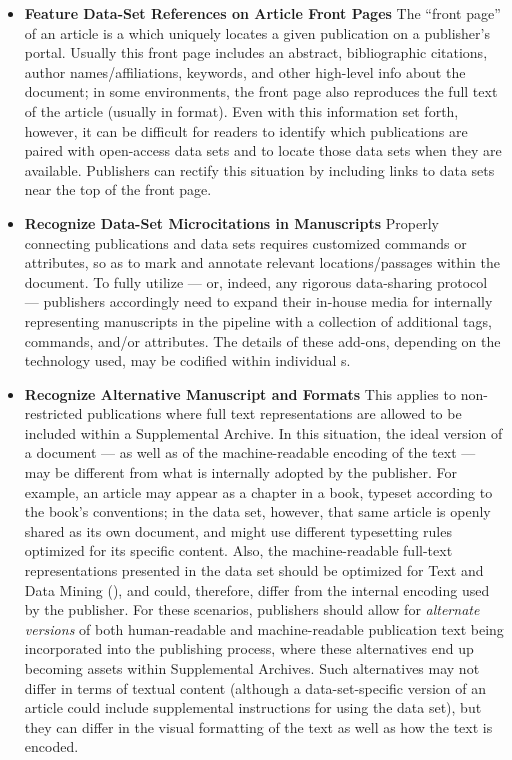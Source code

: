 \documentclass[12pt,letterpaper]{article}
\newcommand{\TDM}{\resizebox{!}{8pt}{\AcronymText{TDM}}}
\newcommand{\ATexttclr}[1]{\textcolor{tcolor}{\textbf{#1}}}
\newcommand{\URL}{\resizebox{!}{8pt}{\AcronymText{URL}}}
\newcommand{\XML}{\resizebox{!}{8pt}{\AcronymText{XML}}}
\newcommand{\textscc}[1]{{\color{orr!35!black}{{%
{\textsc{\textbf{#1}}}}}}}
\newcommand{\AcronymText}[1]{{\textscc{#1}}}
\newcommand{\SDRM}{\resizebox{!}{8pt}{\ATexttclr{SDRM}}}
\newcommand{\SDRF}{\resizebox{!}{8pt}{\ATexttclr{S}}\resizebox{!}{8pt}{\ATexttclr{DR%
\hspace{1pt}{\raisebox{-1pt}{\fontfamily{qhv}\fontseries{b}\selectfont{}\Large{F}}%
}}}}
\newcommand{\HTML}{\resizebox{!}{8pt}{\AcronymText{HTML}}}
\newcommand{\PDF}{\resizebox{!}{8pt}{\AcronymText{PDF}}}
\newcommand{\q}[1]{{\fontfamily{qcr}\selectfont ``}#1{\fontfamily{qcr}\selectfont ''}}
\let\OldLaTeX\LaTeX
\renewcommand{\LaTeX}{\resizebox{!}{8pt}{\color{orr!35!black}{\OldLaTeX}}}
\begin{document}
{{\begin{description}
\begin{itemize}
\item{} \textbf{Feature Data-Set References on Article 
Front Pages} \hspace{14pt}  The \q{front page} of an article is a 
\URL{} which uniquely locates a given publication on a 
publisher's portal.  Usually this front page includes 
an abstract, bibliographic citations, author names/affiliations, 
keywords, and other high-level info about the document; 
in some environments, the front page also reproduces the 
full text of the article (usually in \HTML{} format).  
Even with this information set forth, however, it 
can be difficult for readers to identify which publications 
are paired with open-access data sets and to locate 
those data sets when they are available.  Publishers 
can rectify this situation by including links 
to data sets near the top of the front page.

\item{} \textbf{Recognize Data-Set Microcitations in Manuscripts}  
\hspace{14pt} Properly connecting publications and data sets requires 
customized \LaTeX{} commands or \XML{} attributes, so as 
to mark and annotate relevant locations/passages within the 
document.  To fully utilize \SDRF{} --- or, indeed, 
any rigorous data-sharing protocol --- publishers accordingly 
need to expand their in-house media for internally representing 
manuscripts in the pipeline with a collection of 
additional tags, commands, and/or attributes.  The 
details of these add-ons, depending on the technology 
used, may be codified within individual \SDRM{}s.

\item{} \textbf{Recognize Alternative Manuscript and 
\PDF{} Formats} \hspace{14pt} This applies to non-restricted publications 
where full text representations are allowed to be included within 
a Supplemental Archive.  In this situation, the ideal  
\PDF{} version of a document --- as well as of the machine-readable 
encoding of the text --- may be different from what is 
internally adopted by the publisher.  For example, 
an article may appear as a chapter in a book, typeset 
according to the book's conventions; in the data set, 
however, that same article is openly shared as its own 
document, and might use different typesetting rules 
optimized for its specific content.  Also, the 
machine-readable full-text representations presented 
in the data set should be optimized for Text and Data 
Mining (\TDM{}), and could, therefore, differ from the 
internal encoding used by the publisher.  For these 
scenarios, publishers should allow for \textit{alternate 
versions} of both human-readable and machine-readable 
publication text being incorporated into the publishing 
process, where these alternatives end up becoming 
assets within Supplemental Archives.  Such alternatives 
may not differ in terms of textual content 
(although a data-set-specific version of an article 
could include supplemental instructions for using the data set), 
but they can differ in the visual formatting of the text 
as well as how the text is encoded. 


\end{itemize}
\end{description}}}
\end{document}
